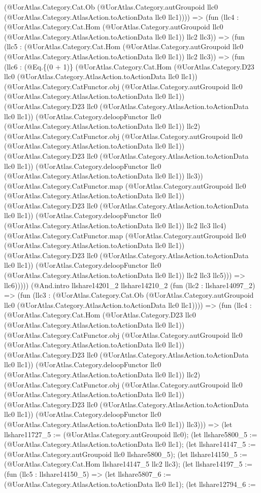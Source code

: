 \documentclass[11pt]{article}
\begin{document}
(@UorAtlas.Category.Cat.Ob (@UorAtlas.Category.autGroupoid llc0 (@UorAtlas.Category.AtlasAction.toActionData llc0 llc1)))) => (fun (llc4 : (@UorAtlas.Category.Cat.Hom (@UorAtlas.Category.autGroupoid llc0 (@UorAtlas.Category.AtlasAction.toActionData llc0 llc1)) llc2 llc3)) => (fun (llc5 : (@UorAtlas.Category.Cat.Hom (@UorAtlas.Category.autGroupoid llc0 (@UorAtlas.Category.AtlasAction.toActionData llc0 llc1)) llc2 llc3)) => (fun (llc6 : (@Eq.\{(0 + 1)\} (@UorAtlas.Category.Cat.Hom (@UorAtlas.Category.D23 llc0 (@UorAtlas.Category.AtlasAction.toActionData llc0 llc1)) (@UorAtlas.Category.CatFunctor.obj (@UorAtlas.Category.autGroupoid llc0 (@UorAtlas.Category.AtlasAction.toActionData llc0 llc1)) (@UorAtlas.Category.D23 llc0 (@UorAtlas.Category.AtlasAction.toActionData llc0 llc1)) (@UorAtlas.Category.deloopFunctor llc0 (@UorAtlas.Category.AtlasAction.toActionData llc0 llc1)) llc2) (@UorAtlas.Category.CatFunctor.obj (@UorAtlas.Category.autGroupoid llc0 (@UorAtlas.Category.AtlasAction.toActionData llc0 llc1)) (@UorAtlas.Category.D23 llc0 (@UorAtlas.Category.AtlasAction.toActionData llc0 llc1)) (@UorAtlas.Category.deloopFunctor llc0 (@UorAtlas.Category.AtlasAction.toActionData llc0 llc1)) llc3)) (@UorAtlas.Category.CatFunctor.map (@UorAtlas.Category.autGroupoid llc0 (@UorAtlas.Category.AtlasAction.toActionData llc0 llc1)) (@UorAtlas.Category.D23 llc0 (@UorAtlas.Category.AtlasAction.toActionData llc0 llc1)) (@UorAtlas.Category.deloopFunctor llc0 (@UorAtlas.Category.AtlasAction.toActionData llc0 llc1)) llc2 llc3 llc4) (@UorAtlas.Category.CatFunctor.map (@UorAtlas.Category.autGroupoid llc0 (@UorAtlas.Category.AtlasAction.toActionData llc0 llc1)) (@UorAtlas.Category.D23 llc0 (@UorAtlas.Category.AtlasAction.toActionData llc0 llc1)) (@UorAtlas.Category.deloopFunctor llc0 (@UorAtlas.Category.AtlasAction.toActionData llc0 llc1)) llc2 llc3 llc5))) => llc6))))) (@And.intro llshare14201\_2 llshare14210\_2 (fun (llc2 : llshare14097\_2) => (fun (llc3 : (@UorAtlas.Category.Cat.Ob (@UorAtlas.Category.autGroupoid llc0 (@UorAtlas.Category.AtlasAction.toActionData llc0 llc1)))) => (fun (llc4 : (@UorAtlas.Category.Cat.Hom (@UorAtlas.Category.D23 llc0 (@UorAtlas.Category.AtlasAction.toActionData llc0 llc1)) (@UorAtlas.Category.CatFunctor.obj (@UorAtlas.Category.autGroupoid llc0 (@UorAtlas.Category.AtlasAction.toActionData llc0 llc1)) (@UorAtlas.Category.D23 llc0 (@UorAtlas.Category.AtlasAction.toActionData llc0 llc1)) (@UorAtlas.Category.deloopFunctor llc0 (@UorAtlas.Category.AtlasAction.toActionData llc0 llc1)) llc2) (@UorAtlas.Category.CatFunctor.obj (@UorAtlas.Category.autGroupoid llc0 (@UorAtlas.Category.AtlasAction.toActionData llc0 llc1)) (@UorAtlas.Category.D23 llc0 (@UorAtlas.Category.AtlasAction.toActionData llc0 llc1)) (@UorAtlas.Category.deloopFunctor llc0 (@UorAtlas.Category.AtlasAction.toActionData llc0 llc1)) llc3))) => (let llshare11727\_5 := (@UorAtlas.Category.autGroupoid llc0); (let llshare5800\_5 := (@UorAtlas.Category.AtlasAction.toActionData llc0 llc1); (let llshare14147\_5 := (@UorAtlas.Category.autGroupoid llc0 llshare5800\_5); (let llshare14150\_5 := (@UorAtlas.Category.Cat.Hom llshare14147\_5 llc2 llc3); (let llshare14197\_5 := (fun (llc5 : llshare14150\_5) => (let llshare5807\_6 := (@UorAtlas.Category.AtlasAction.toActionData llc0 llc1); (let llshare12794\_6 := 
\end{document}
